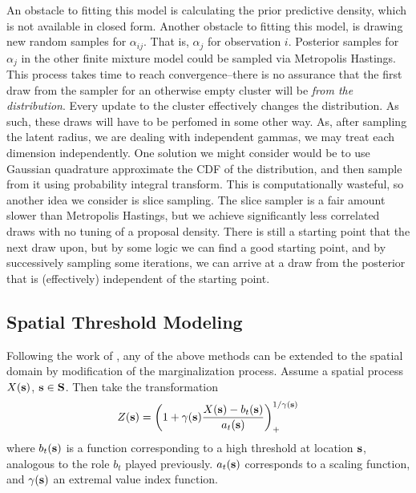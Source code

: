 An obstacle to fitting this model is calculating the prior predictive density,
  which is not available in closed form.  Another obstacle to fitting this
  model, is drawing new random samples for $\alpha_{ij}$.  That is, $\alpha_j$
  for observation $i$.  Posterior samples for $\alpha_j$ in the other finite
  mixture model could be sampled via Metropolis Hastings.  This process takes 
  time to reach convergence--there is no assurance that the first draw from 
  the sampler for an otherwise empty cluster will be \emph{from the distribution}.
  Every update to the cluster effectively changes the distribution.  As such, 
  these draws will have to be perfomed in some other way.  As, after sampling the
  latent radius, we are dealing with independent gammas, we may treat each dimension
  independently.  One solution we might consider would be to use Gaussian quadrature
  approximate the CDF of the distribution, and then sample from it using probability
  integral transform.  This is computationally wasteful, so another idea we
  consider is slice sampling.  The slice sampler is a fair amount slower than
  Metropolis Hastings, but we achieve significantly less correlated draws with no
  tuning of a proposal density.  There is still a starting point that the next draw
  upon, but by some logic we can find a good starting point, and by successively
  sampling some iterations, we can arrive at a draw from the posterior that is
  (effectively) independent of the starting point.
 
\subsection{Spatial Threshold Modeling}
Following the work of \cite{ferreira2014}, any of the above methods can be
  extended to the spatial domain by modification of the marginalization process.
  Assume a spatial process $X({\bf s})$, ${\bf s}\in {\bf S}$.  Then take the
  transformation
\begin{equation}
  \label{eqn:spatial}
  Z({\bf s}) = \left(1 + \gamma({\bf s})\frac{X({\bf s}) - b_t({\bf s})}{a_t({\bf s})}\right)_{+}^{1/{\gamma({\bf s})}}
\end{equation}
  where $b_t({\bf s})$ is a function corresponding to a high threshold at location
  ${\bf s}$, analogous to the role $b_t$ played previously. $a_t({\bf s})$
  corresponds to a scaling function, and $\gamma({\bf s})$ an extremal value index
  function.







